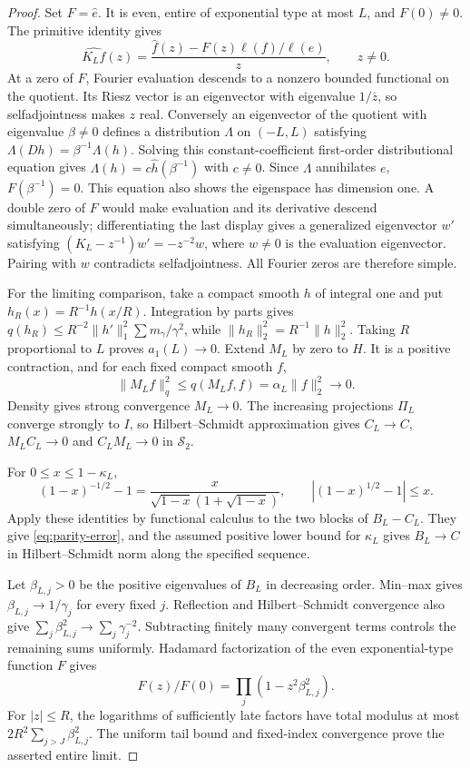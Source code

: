 \begin{proof}
Set $F=\widehat e$. It is even, entire of exponential type at most $L$,
and $F(0)\ne0$. The primitive identity gives
\[
 \widehat {K_Lf}(z)=
 \frac{\widehat f(z)-F(z)\ell(f)/\ell(e)}{z},\qquad z\ne0.
\]
At a zero of $F$, Fourier evaluation descends to a nonzero bounded
functional on the quotient. Its Riesz vector is an eigenvector with
eigenvalue $1/\overline z$, so selfadjointness makes $z$ real.
Conversely an eigenvector of the quotient with eigenvalue $\beta\ne0$
defines a distribution $\Lambda$ on $(-L,L)$ satisfying
$\Lambda(Dh)=\beta^{-1}\Lambda(h)$. Solving this constant-coefficient
first-order distributional equation gives
$\Lambda(h)=c\widehat h(\beta^{-1})$ with $c\ne0$. Since $\Lambda$
annihilates $e$, $F(\beta^{-1})=0$. This equation also shows the
eigenspace has dimension one. A double zero of $F$ would make evaluation
and its derivative descend simultaneously; differentiating the last
display gives a generalized eigenvector $w'$ satisfying
$(K_L-z^{-1})w'=-z^{-2}w$, where $w\ne0$ is the evaluation eigenvector.
Pairing with $w$ contradicts selfadjointness. All Fourier zeros are
therefore simple.

For the limiting comparison, take a compact smooth $h$ of integral one
and put $h_R(x)=R^{-1}h(x/R)$. Integration by parts gives
$q(h_R)\le R^{-2}\|h'\|_1^2\sum m_\gamma/\gamma^2$, while
$\|h_R\|_2^2=R^{-1}\|h\|_2^2$. Taking $R$ proportional to $L$ proves
$a_1(L)\to0$. Extend $M_L$ by zero to $H$. It is a positive contraction,
and for each fixed compact smooth $f$,
\[
 \|M_Lf\|_q^2\le q(M_Lf,f)=\alpha_L\|f\|_2^2\longrightarrow0.
\]
Density gives strong convergence $M_L\to0$. The increasing projections
$\Pi_L$ converge strongly to $I$, so Hilbert--Schmidt approximation gives
$C_L\to C$, $M_LC_L\to0$ and $C_LM_L\to0$ in
$\mathcal S_2$.

For $0\le x\le1-\kappa_L$,
\[
 (1-x)^{-1/2}-1
 =\frac{x}{\sqrt{1-x}(1+\sqrt{1-x})},\qquad
 |(1-x)^{1/2}-1|\le x.
\]
Apply these identities by functional calculus to the two blocks of
$B_L-C_L$. They give \eqref{eq:parity-error}, and the assumed positive
lower bound for $\kappa_L$ gives $B_L\to C$ in Hilbert--Schmidt norm
along the specified sequence.

Let $\beta_{L,j}>0$ be the positive eigenvalues of $B_L$ in decreasing
order. Min--max gives $\beta_{L,j}\to1/\gamma_j$ for every fixed $j$.
Reflection and Hilbert--Schmidt convergence also give
$\sum_j\beta_{L,j}^2\to\sum_j\gamma_j^{-2}$. Subtracting finitely
many convergent terms controls the remaining sums uniformly.
Hadamard factorization of the even exponential-type function $F$ gives
\[
 F(z)/F(0)=\prod_j(1-z^2\beta_{L,j}^2).
\]
For $|z|\le R$, the logarithms of sufficiently late factors have total
modulus at most $2R^2\sum_{j>J}\beta_{L,j}^2$. The uniform tail bound
and fixed-index convergence prove the asserted entire limit.
\end{proof}

